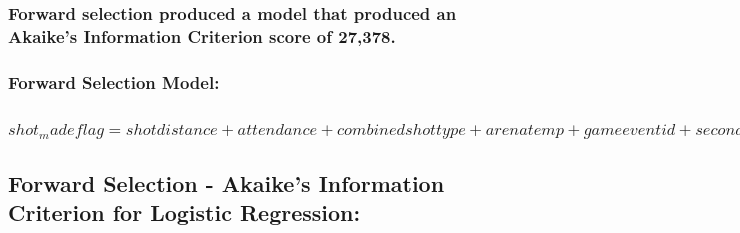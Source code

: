 \documentclass[]{article}
\begin{document}
\hypertarget{forward-selection-produced-a-model-that-produced-an-akaikes-information-criterion-score-of-27378.}{%
\subsubsection{Forward selection produced a model that produced an
Akaike's Information Criterion score of
27,378.}\label{forward-selection-produced-a-model-that-produced-an-akaikes-information-criterion-score-of-27378.}}

\hypertarget{section-1}{%
\subsubsection{}\label{section-1}}

\hypertarget{forward-selection-model}{%
\subsubsection{Forward Selection Model:}\label{forward-selection-model}}

\hypertarget{shot_made-flag-shot-distance-attendance-combined-shot-type-arena-temp-game-event-id-seconds-remaining-shot-type-game-date-minutes-remaining-loc-y-shot-id}{%
\subsubsection{\texorpdfstring{\(shot_made flag = shot distance + attendance + combined shot type + arena temp + game event id + seconds remaining + shot type + game date + minutes remaining + loc y + shot id\)}{shot\_made flag = shot distance + attendance + combined shot type + arena temp + game event id + seconds remaining + shot type + game date + minutes remaining + loc y + shot id}}\label{shot_made-flag-shot-distance-attendance-combined-shot-type-arena-temp-game-event-id-seconds-remaining-shot-type-game-date-minutes-remaining-loc-y-shot-id}}

\hypertarget{forward-selection---akaikes-information-criterion-for-logistic-regression}{%
\subsection{\texorpdfstring{\textbf{Forward Selection - Akaike's
Information Criterion for Logistic
Regression:}}{Forward Selection - Akaike's Information Criterion for Logistic Regression:}}\label{forward-selection---akaikes-information-criterion-for-logistic-regression}}
\end{document}
